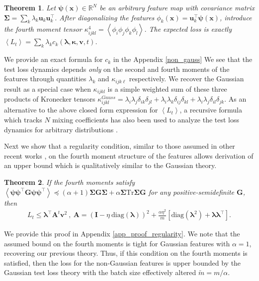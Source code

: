 \documentclass{article} %
\def\x{\bm x}
\newtheorem{theorem}{Theorem}
\def\x{\mathbf x}
\def\v{\mathbf v}
\def\bSigma{\mathbf \Sigma}
\def\A{\mathbf A}
\def\u{\mathbf u}
\def\I{\mathbf I}
\begin{document}
\begin{theorem}\label{arbitary_features}
Let $\bm\psi(\x) \in \mathbb{R}^N$ be an arbitrary feature map with covariance matrix $\bSigma = \sum_k \lambda_k \u_k \u_k^\top$. After diagonalizing the features $\phi_k(\x) = \u_k^\top \bm\psi(\x)$, introduce the fourth moment tensor $\kappa_{ijkl}^4 = \left< \phi_i \phi_j \phi_k \phi_l \right>$. The expected loss is exactly $\left< L_t \right> = \sum_k \lambda_k c_k( \bm\lambda, \bm \kappa, \v, t)$. 
\end{theorem}
We provide an exact formula for $c_k$ in the Appendix \ref{non_gauss} 
We see that the test loss dynamics depends \textit{only} on the second and fourth moments of the features through quantities $\lambda_k$ and $\kappa_{ijk\ell}$ respectively. We recover the Gaussian result as a special case when $\kappa_{ijkl}$ is a simple weighted sum of these three products of Kronecker tensors $\kappa_{ijkl}^{Gauss} = \lambda_i \lambda_j \delta_{ik}\delta_{jl} + \lambda_i \lambda_k \delta_{ij}\delta_{kl} + \lambda_{i} \lambda_j \delta_{il}\delta_{jk}$. As an alternative to the above closed form expression for $\left< L_t \right>$, a recursive formula which tracks $N$ mixing coefficients has also been used to analyze the test loss dynamics for arbitrary distributions \citep{varre2021iterate}. 

 Next we show that a regularity condition, similar to those assumed in other recent works \citep{jain2018accelerating,berthier2020tight, varre2021iterate}, on the fourth moment structure of the features allows derivation of an upper bound which is qualitatively similar to the Gaussian theory. 
\begin{theorem}\label{th_regularity}
If the fourth moments satisfy $\left< \bm\psi \bm\psi^\top \bm G \bm\psi \bm\psi^\top  \right> \preceq (\alpha+1) \bm\Sigma \bm G \bm \Sigma + \alpha \bm\Sigma \text{Tr} \bm\Sigma \bm G$ for any positive-semidefinite $\bm G$, then
\begin{align}
    L_t \leq \bm\lambda^\top \A^t \mathbf{v}^2 \ , \ \A = \left( \I - \eta  \ \text{diag}(\bm\lambda) \right)^2 + \frac{\alpha \eta^2}{m} \left[ \text{diag}(\bm\lambda^2) +  \bm\lambda\bm\lambda^\top \right].
\end{align}
\end{theorem}
We provide this proof in Appendix \ref{app_proof_regularity}. We note that the assumed bound on the fourth moments is tight for Gaussian features with $\alpha=1$, recovering our previous theory. Thus, if this condition on the fourth moments is satisfied, then the loss for the non-Gaussian features is upper bounded by the Gaussian test loss theory with the batch size effectively altered $\tilde{m} = m / \alpha$. 
\end{document}
